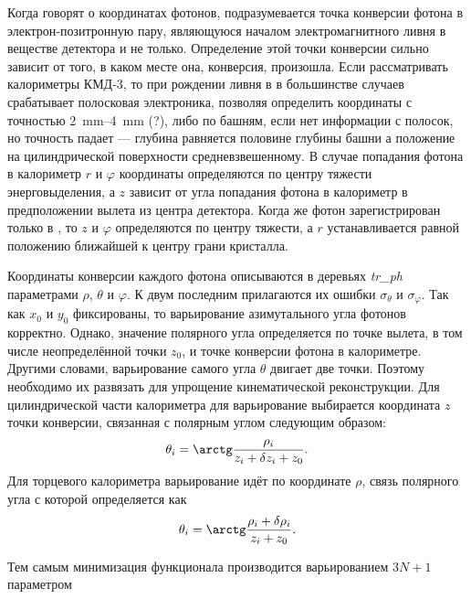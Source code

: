 Когда говорят о координатах фотонов, подразумевается точка конверсии фотона в электрон-позитронную пару, 
являющуюся началом электромагнитного ливня в веществе детектора и не только. 
Определение этой точки конверсии сильно зависит от того, в каком месте она, конверсия, произошла.
Если рассматривать калориметры КМД-3, 
то при рождении ливня в  в большинстве случаев срабатывает полосковая электроника, позволяя определить координаты с точностью \SIrange[range-phrase=--]{2}{4}{\mm} (?), 
либо по башням, если нет информации с полосок, но точность падает --- глубина равняется половине глубины башни а положение на цилиндрической поверхности средневзвешенному. 
В случае попадания фотона в  калориметр $r$ и $\varphi$ координаты определяются по центру тяжести энерговыделения, 
а $z$ зависит от угла попадания фотона в калориметр в предположении вылета из центра детектора. 
Когда же фотон зарегистрирован только в , то $z$ и $\varphi$ определяются по центру тяжести, 
а $r$ устанавливается равной положению ближайшей к центру грани кристалла.

Координаты конверсии каждого фотона описываются в деревьях \textit{tr\_ph} параметрами $\rho$, $\theta$ и $\varphi$.
К двум последним прилагаются их ошибки $\sigma_\theta$ и $\sigma_\varphi$.
Так как $x_0$ и $y_0$ фиксированы,
то варьирование азимутального угла фотонов корректно.
Однако,
значение полярного угла определяется по точке вылета,
в том числе неопределённой точки $z_0$,
и точке конверсии фотона в калориметре.
Другими словами,
варьирование самого угла $\theta$ двигает две точки.
Поэтому необходимо их развязать для упрощение кинематической реконструкции.
Для цилиндрической части калориметра для варьирование выбирается координата $z$ точки конверсии,
связанная с полярным углом следующим образом:
\begin{equation}
    \theta_i
    =
    \arctg
    \frac{\rho_i}{z_i + \delta z_i + z_0} .
\end{equation}
Для торцевого калориметра варьирование идёт по координате $\rho$,
связь полярного угла с которой определяется как
\begin{equation}
    \theta_i
    =
    \arctg
    \frac{\rho_i + \delta \rho_i}{z_i + z_0} .
\end{equation}

Тем самым минимизация функционала производится варьированием $3 N + 1$ параметром

